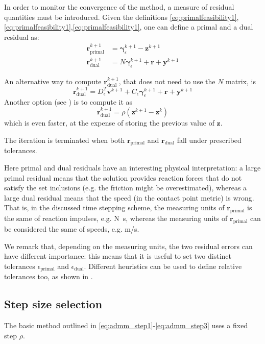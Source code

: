 \documentclass[final,3p]{elsarticle}
\newcommand{\vect}[1]{\bm{#1}}
\begin{document}
In order to monitor the convergence of the method, a measure of residual quantities must be introduced. 
Given the definitions \eqref{eq:primalfeasibility1},\eqref{eq:primalfeasibility1},\eqref{eq:primalfeasibility1}, one can define a primal and a dual residual as:
%
\begin{align}
 \vect{r}_{\text{primal}}^{k+1} &= \vect{\gamma}_\epsilon^{k+1}-\vect{z}^{k+1}   \\
 \vect{r}_{\text{dual}}^{k+1} &= N \vect{\gamma}_\epsilon^{k+1}+\vect{r}+\vect{y}^{k+1} 
\end{align}

An alternative way to compute $\vect{r}_{\text{dual}}^{k+1}$, that does not need to use the $N$ matrix, is 
\[
   \vect{r}_{\text{dual}}^{k+1} = D_\epsilon^T \vect{v}^{k+1} +C_\epsilon \vect{\gamma}_\epsilon^{k+1} + \vect{r} + \vect{y}^{k+1}
\]
Another option (see \cite{Boyd2011}) is to compute it as
\[
   \vect{r}_{\text{dual}}^{k+1} = \rho (\vect{z}^{k+1} - \vect{z}^{k})
\]
which is even faster, at the expense of storing the previous value of $\vect{z}$. 

The iteration is terminated when both $\vect{r}_{\text{primal}}$ and $\vect{r}_{\text{dual}}$ fall under prescribed tolerances. 

Here primal and dual residuals have an interesting physical interpretation: a large primal residual means that the solution provides reaction forces that do not satisfy the set inclusions (e.g. the friction might be overestimated), whereas a large dual residual means that the speed (in the contact point metric) is wrong. That is, in the discussed time stepping scheme, the measuring units of $\vect{r}_{\text{primal}}$ is the same of reaction impulses, e.g. \si{N.s}, whereas the measuring units of $\vect{r}_{\text{primal}}$ can be considered the same of speeds, e.g. \si{m/s}.

We remark that, depending on the measuring units, the two residual errors can have different importance: this means that it is useful to set two distinct tolerances $\epsilon_{\text{primal}}$ and $\epsilon_{\text{dual}}$. Different heuristics can be used to define relative tolerances too, as shown in \cite{Stellato2020}.


\subsection{Step size selection}

The basic method outlined in \eqref{eq:admm_step1}-\eqref{eq:admm_step3} uses a fixed step $\rho$. 
\end{document}
